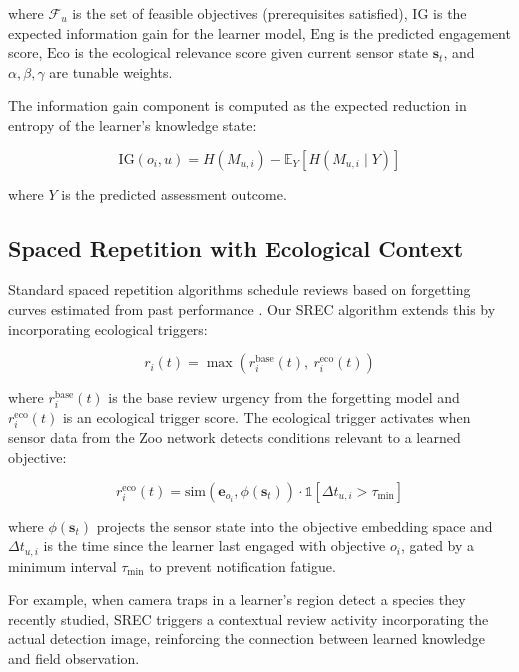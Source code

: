 \noindent where $\mathcal{F}_u$ is the set of feasible objectives (prerequisites satisfied), $\text{IG}$ is the expected information gain for the learner model, $\text{Eng}$ is the predicted engagement score, $\text{Eco}$ is the ecological relevance score given current sensor state $\mathbf{s}_t$, and $\alpha, \beta, \gamma$ are tunable weights.

The information gain component is computed as the expected reduction in entropy of the learner's knowledge state:

\begin{equation}
    \text{IG}(o_i, u) = H(M_{u,i}) - \mathbb{E}_{Y}\left[H(M_{u,i} \mid Y)\right]
\end{equation}

\noindent where $Y$ is the predicted assessment outcome.

\subsection{Spaced Repetition with Ecological Context}
\label{sec:srec}

Standard spaced repetition algorithms schedule reviews based on forgetting curves estimated from past performance \citep{settles2016trainable}.
Our SREC algorithm extends this by incorporating ecological triggers:

\begin{equation}
    r_i(t) = \max\left(r_i^{\text{base}}(t),\ r_i^{\text{eco}}(t)\right)
\end{equation}

\noindent where $r_i^{\text{base}}(t)$ is the base review urgency from the forgetting model and $r_i^{\text{eco}}(t)$ is an ecological trigger score.
The ecological trigger activates when sensor data from the Zoo network detects conditions relevant to a learned objective:

\begin{equation}
    r_i^{\text{eco}}(t) = \text{sim}(\mathbf{e}_{o_i}, \phi(\mathbf{s}_t)) \cdot \mathbb{1}[\Delta t_{u,i} > \tau_{\min}]
\end{equation}

\noindent where $\phi(\mathbf{s}_t)$ projects the sensor state into the objective embedding space and $\Delta t_{u,i}$ is the time since the learner last engaged with objective $o_i$, gated by a minimum interval $\tau_{\min}$ to prevent notification fatigue.

For example, when camera traps in a learner's region detect a species they recently studied, SREC triggers a contextual review activity incorporating the actual detection image, reinforcing the connection between learned knowledge and field observation.

